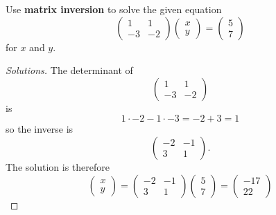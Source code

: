 \documentclass[12pt]{amsart}
\begin{document}
\newpage

\begin{thm}[10 Points]
  Use {\bf matrix inversion} to solve the given equation
  $$\left(\begin{array}{rr}
    1 & 1 \\
    -3 & -2
  \end{array}\right) 
  \left(\begin{array}{r}
    x \\
    y
  \end{array}\right) = 
  \left(\begin{array}{r}
    5 \\
    7
  \end{array}\right)$$
  for $x$ and $y$.
  \begin{proof}[Solutions]
    The determinant of 
    $$\left(\begin{array}{rr}
    1 & 1 \\
    -3 & -2
  \end{array}\right)$$
    is 
    $$1 \cdot -2 - 1 \cdot -3 = -2 + 3 = 1$$
    so the inverse is
    $$\left(\begin{array}{rr}
      -2 & -1 \\
      3 & 1
  \end{array}\right).$$
    The solution is therefore
    $$\left(\begin{array}{r}
    x \\
    y
  \end{array}\right) = 
    \left(\begin{array}{rr}
      -2 & -1 \\
      3 & 1
  \end{array}\right)
    \left(\begin{array}{r}
    5 \\
    7
  \end{array}\right) = \left(\begin{array}{r}
    -17 \\
    22
  \end{array}\right)$$
  \end{proof}
\end{thm}
\newpage
\end{document}

